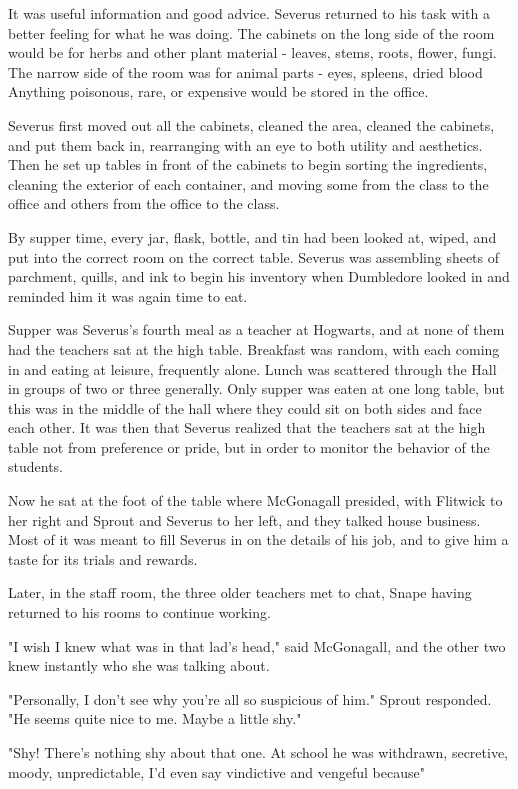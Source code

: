 It was useful information and good advice. Severus returned to his task with a better feeling for what he was doing. The cabinets on the long side of the room would be for herbs and other plant material - leaves, stems, roots, flower, fungi. The narrow side of the room was for animal parts - eyes, spleens, dried blood{\el} Anything poisonous, rare, or expensive would be stored in the office.

Severus first moved out all the cabinets, cleaned the area, cleaned the cabinets, and put them back in, rearranging with an eye to both utility and aesthetics. Then he set up tables in front of the cabinets to begin sorting the ingredients, cleaning the exterior of each container, and moving some from the class to the office and others from the office to the class.

By supper time, every jar, flask, bottle, and tin had been looked at, wiped, and put into the correct room on the correct table. Severus was assembling sheets of parchment, quills, and ink to begin his inventory when Dumbledore looked in and reminded him it was again time to eat.

Supper was Severus's fourth meal as a teacher at Hogwarts, and at none of them had the teachers sat at the high table. Breakfast was random, with each coming in and eating at leisure, frequently alone. Lunch was scattered through the Hall in groups of two or three generally. Only supper was eaten at one long table, but this was in the middle of the hall where they could sit on both sides and face each other. It was then that Severus realized that the teachers sat at the high table not from preference or pride, but in order to monitor the behavior of the students.

Now he sat at the foot of the table where McGonagall presided, with Flitwick to her right and Sprout and Severus to her left, and they talked house business. Most of it was meant to fill Severus in on the details of his job, and to give him a taste for its trials and rewards.

Later, in the staff room, the three older teachers met to chat, Snape having returned to his rooms to continue working.

"I wish I knew what was in that lad's head," said McGonagall, and the other two knew instantly who she was talking about.

"Personally, I don't see why you're all so suspicious of him." Sprout responded. "He seems quite nice to me. Maybe a little shy."

"Shy! There's nothing shy about that one. At school he was withdrawn, secretive, moody, unpredictable, I'd even say vindictive and vengeful because{\el}"

